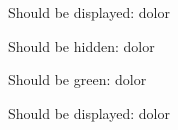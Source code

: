 


{}

Should be displayed:  dolor

Should be hidden:  dolor

Should be green:  dolor

Should be displayed:  dolor

\bye
